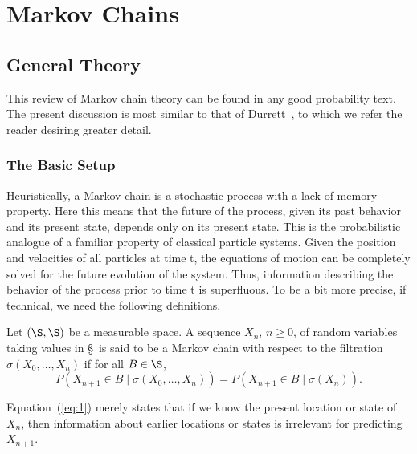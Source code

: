 \chapter{Markov Chains}

\section{General Theory}

This review of Markov chain theory can be found in any good probability text. The present
discussion is most similar to that of Durrett~\cite{Durret:1996}, to which we
refer the reader desiring greater detail. 

\subsection{The Basic Setup}

Heuristically, a Markov chain is a stochastic process with a lack of memory property. Here
this means that the future of the process, given its past behavior and its present state, depends only
on its present state. This is the probabilistic analogue of a familiar property of classical particle
systems. Given the position and velocities of all particles at time t, the equations of motion can be
completely solved for the future evolution of the system. Thus, information describing the behavior
of the process prior to time t is superﬂuous. To be a bit more precise, if technical, we need the
following definitions.

\begin{definition}
Let $(\S, \S)$ be a measurable space. A sequence $X_n$, $n\geq 0$, of random variables
taking values in \S\ is said to be a Markov chain with respect to the filtration 
$\sigma(X_0, \dots, X_{n})$ if for all $B \in \S$,
\begin{equation}
\label{eq:1}
P(X_{n+1} \in B \mid \sigma(X_0, \dots, X_{n}))
=P(X_{n+1} \in B \mid \sigma(X_{n})).
\end{equation}
\end{definition}
Equation~(\ref{eq:1}) merely states that if we know the present location or state of $X_{n}$,
then information about earlier locations or states is irrelevant for predicting $X_{n+1}$.

